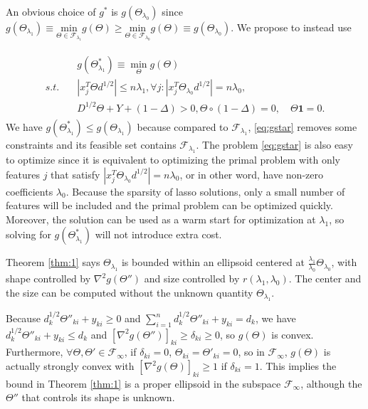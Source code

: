 An obvious choice of $g^*$ is $g(\Theta_{\lambda_0})$ since $g(\Theta_{\lambda_1})\equiv\underset{\Theta\in \mathcal{F}_{\lambda_1}}{\mathrm{min}}g(\Theta)\geq\underset{\Theta\in \mathcal{F}_{\lambda_0}}{\mathrm{min}}g(\Theta)\equiv g\left(\Theta_{\lambda_0}\right)$. We propose to instead use 

\begin{gather}
    \label{eq:gstar}
    \begin{aligned}
        &g(\Theta^*_{\lambda_1})\equiv\min_\Theta g(\Theta)\\
        s.t.\quad &|x_j^T\Theta d^{1/2}|\leq n\lambda_1,\forall j:|x_j^T\Theta_{\lambda_0} d^{1/2}|= n\lambda_0,\\&D^{1/2}\Theta+Y+(1-\Delta)> 0, \Theta\circ(1-\Delta)=0,\quad \Theta\mathbf{1}=0.
    \end{aligned}
\end{gather}
We have $g(\Theta^*_{\lambda_1})\leq g(\Theta_{\lambda_1})$ because compared to $\mathcal{F}_{\lambda_1}$, \eqref{eq:gstar} removes some constraints and its feasible set contains $\mathcal{F}_{\lambda_1}$. The problem \eqref{eq:gstar} is also easy to optimize since it is equivalent to optimizing the primal problem with only features $j$ that satisfy $|x_j^T\Theta_{\lambda_0} d^{1/2}|= n\lambda_0$, or in other word, have non-zero coefficients $\lambda_0$. Because the sparsity of lasso solutions, only a small number of features will be included and the primal problem can be optimized quickly. Moreover, the solution can be used as a warm start for optimization at $\lambda_1$, so solving for $g(\Theta^*_{\lambda_1})$ will not introduce extra cost.

Theorem \ref{thm:1} says $\Theta_{\lambda_1}$ is bounded within an ellipsoid centered at $\frac{\lambda_1}{\lambda_0}\Theta_{\lambda_0}$, with shape controlled by $\nabla^2g(\Theta'')$ and size controlled by $r(\lambda_1,\lambda_0)$. The center and the size can be computed without the unknown quantity $\Theta_{\lambda_1}$. 

 Because $d_k^{1/2}\Theta''_{ki}+y_{ki}\geq 0$ and $\sum_{i=1}^nd_k^{1/2}\Theta''_{ki}+y_{ki}=d_k$, we have $d_k^{1/2}\Theta''_{ki}+y_{ki}\leq d_k$ and $[\nabla^2 g(\Theta'')]_{ki}\geq\delta_{ki}\geq 0$, so $g(\Theta)$ is convex. Furthermore, $\forall\Theta,\Theta'\in\mathcal{F}_{\infty}$, if $\delta_{ki}=0$, $\Theta_{ki}=\Theta'_{ki}=0$, so in $\mathcal{F}_{\infty}$, $g(\Theta)$ is actually strongly convex with $[\nabla^2 g(\Theta)]_{ki}\geq 1$ if $\delta_{ki}=1$. This implies the bound in Theorem \ref{thm:1} is a proper ellipsoid in the subspace $\mathcal{F}_{\infty}$, although the $\Theta''$ that controls its shape is unknown.

